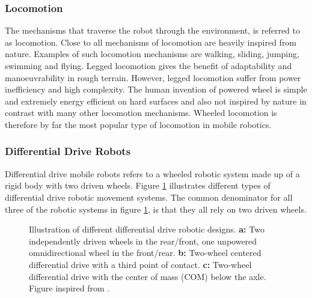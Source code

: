 \subsubsection{Locomotion}
The mechanisms that traverse the robot through the environment, is referred to as locomotion. Close to all mechanisms of locomotion are heavily inspired from nature. Examples of such locomotion mechanisms are walking, sliding, jumping, swimming and flying. Legged locomotion gives the benefit of adaptability and manoeuvrability in rough terrain. However, legged locomotion suffer from power inefficiency and high complexity. The human invention of powered wheel is simple and extremely energy efficient on hard surfaces and also not inspired by nature in contrast with many other locomotion mechanisms. Wheeled locomotion is therefore by far the most popular type of locomotion in mobile robotics\cite{SiegwartRoland2011Itam}. 

\subsubsection{Differential Drive Robots}\label{sec:T:AN:MRD:DifferentialDriveRobots}
Differential drive mobile robots refers to a wheeled robotic system made up of a rigid body with two driven wheels. Figure \ref{fig:differentialDrive} illustrates different types of differential drive robotic movement systems. The common denominator for all three of the robotic systems in figure \ref{fig:differentialDrive}, is that they all rely on two driven wheels.

\begin{figure}[htp]
  \centering
  
  \caption{Illustration of different differential drive robotic designs. \textbf{a:} Two independently driven wheels in the rear/front, one unpowered omnidirectional wheel in the front/rear. \textbf{b:} Two-wheel centered differential drive with a third point of contact. \textbf{c:} Two-wheel differential drive with the center of mass (COM) below the axle. Figure inspired from \cite{SiegwartRoland2011Itam}.}
  \label{fig:differentialDrive}
\end{figure}


